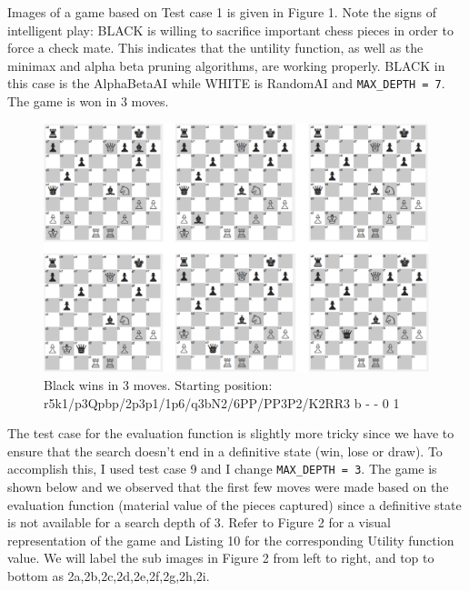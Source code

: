 \documentclass[9.5pt]{extarticle}
\begin{document}
Images of a game based on Test case 1 is given in Figure 1. Note the signs of intelligent play: BLACK is willing to sacrifice important chess pieces in order to force a check mate. This indicates that the untility function, as well as the minimax and alpha beta pruning algorithms, are working properly. BLACK in this case is the AlphaBetaAI while WHITE is RandomAI and \verb`MAX_DEPTH = 7`. The game is won in 3 moves.

\begin{figure}[H]
\centering
\includegraphics[scale=0.7]{game1.png}
\caption{Black wins in 3 moves. Starting position: r5k1/p3Qpbp/2p3p1/1p6/q3bN2/6PP/PP3P2/K2RR3 b - - 0 1 }
\label{Figure 1}
\end{figure}

The test case for the evaluation function is slightly more tricky since we have to ensure that the search doesn't end in a definitive state (win, lose or draw). To accomplish this, I used test case 9 and I change \verb`MAX_DEPTH = 3`. The game is shown below and we observed that the first few moves were made based on the evaluation function (material value of the pieces captured) since a definitive state is not available for a search depth of 3. Refer to Figure 2 for a visual representation of the game and Listing 10 for the corresponding Utility function value. We will label the sub images in Figure 2 from left to right, and top to bottom as 2a,2b,2c,2d,2e,2f,2g,2h,2i.\\
\end{document}
